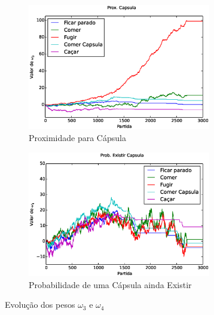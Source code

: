 \begin{figure}[h]
	\centering
	\begin{subfigure}[t]{.5\textwidth}
		\centering
		\includegraphics[width=80mm]{images/5_behaviors_small_map/weights____pol__DistCapsula}
		\caption{Proximidade para Cápsula}
		\label{img:5ComportamentosMapaPequeno:PesoDistCapsula}
	\end{subfigure}%
	\begin{subfigure}[t]{.5\textwidth}
		\centering
		\includegraphics[width=80mm]{images/5_behaviors_small_map/weights____pol__ProbExistirCapsula}
		\caption{Probabilidade de uma Cápsula ainda Existir}
		\label{img:5ComportamentosMapaPequeno:PesoProbCapsulaExistir}
	\end{subfigure}
	\caption{Evolução dos pesos $ \omega_3 $ e $ \omega_4 $}
	\label{img:5ComportamentosMapaPequeno:PesoDistCapsulaOuProbCapsulaExistir}
\end{figure}

